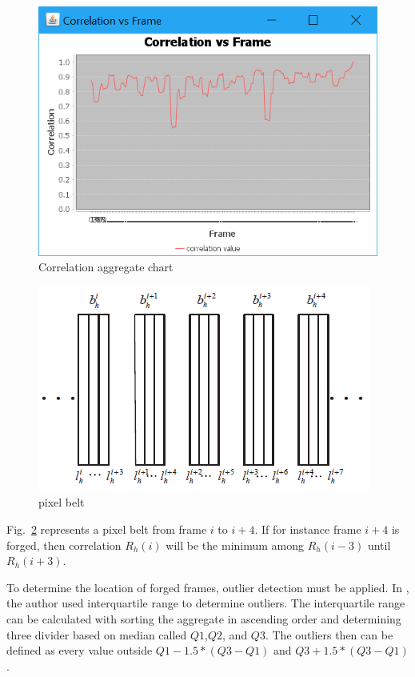 \documentclass[conference]{IEEEtran}
\begin{document}
\begin{figure}[htbp]
\centerline{\includegraphics[width=0.9\linewidth]{corrvsframe.PNG}}
\caption{Correlation aggregate chart}
\label{corrvsframe}
\end{figure}

\begin{figure}[htbp]
\centerline{\includegraphics{pixelbelt.PNG}}
\caption{pixel belt}
\label{pixelbelt}
\end{figure}

Fig.~\ref{pixelbelt} represents a pixel belt from frame $i$ to $i+4$. If for instance frame $i+4$ is forged, then correlation $R_h(i)$ will be the minimum among $R_h(i-3)$ until $R_h(i+3)$.

To determine the location of forged frames, outlier detection must be applied. In \cite{b2}, the author used interquartile range to determine outliers. The interquartile range can be calculated with sorting the aggregate in ascending order and determining three divider based on median called $Q1$,$Q2$, and $Q3$. The outliers then can be defined as every value outside $Q1-1.5*(Q3-Q1)$ and $Q3+1.5*(Q3-Q1)$.
\end{document}
